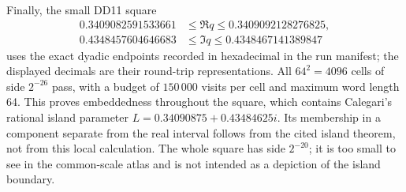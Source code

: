Finally, the small DD11 square
\[
\begin{split}
0.3409082591533661&\le\Re q\le0.3409092128276825,\\
0.4348457604646683&\le\Im q\le0.4348467141389847
\end{split}
\]
uses the exact dyadic endpoints recorded in hexadecimal in the run
manifest; the displayed decimals are their round-trip representations.
All $64^2=4096$ cells of side $2^{-26}$ pass, with a budget of
$150\,000$ visits per cell and maximum word length 64. This proves
embeddedness throughout the square, which contains Calegari's rational
island parameter $L=0.34090875+0.43484625i$. Its membership in a component
separate from the real interval follows from the cited island theorem,
not from this local calculation. The whole square has side $2^{-20}$;
it is too small to see in the common-scale atlas and is not intended
as a depiction of the island boundary.
